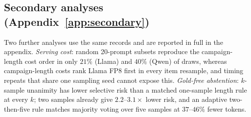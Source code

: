 \documentclass[11pt,a4paper]{article}
\begin{document}
\subsection{Secondary analyses (Appendix~\ref{app:secondary})}
\label{sec:secondary}
Two further analyses use the same records and are reported in full in the appendix. \emph{Serving cost}: random 20-prompt subsets reproduce the campaign-length cost order in only $21\%$ (Llama) and $40\%$ (Qwen) of draws, whereas campaign-length costs rank Llama FP8 first in every item resample, and timing repeats that share one sampling seed cannot expose this. \emph{Gold-free abstention}: $k$-sample unanimity has lower selective risk than a matched one-sample length rule at every $k$; two samples already give $2.2$--$3.1\times$ lower risk, and an adaptive two-then-five rule matches majority voting over five samples at $37$--$46\%$ fewer tokens.
\end{document}
